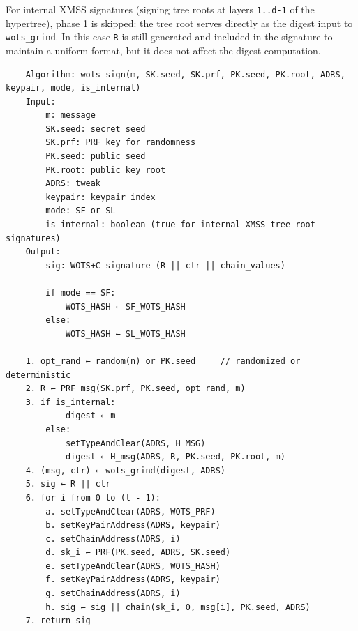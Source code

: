 For internal XMSS signatures (signing tree roots at layers \texttt{1..d-1} of the hypertree), phase 1 is skipped: the tree root serves directly as the digest input to \texttt{wots\_grind}. In this case \texttt{R} is still generated and included in the signature to maintain a uniform format, but it does not affect the digest computation.
\begin{verbatim}
    Algorithm: wots_sign(m, SK.seed, SK.prf, PK.seed, PK.root, ADRS, keypair, mode, is_internal)
    Input:
        m: message 
        SK.seed: secret seed
        SK.prf: PRF key for randomness
        PK.seed: public seed
        PK.root: public key root
        ADRS: tweak
        keypair: keypair index
        mode: SF or SL
        is_internal: boolean (true for internal XMSS tree-root signatures)
    Output:
        sig: WOTS+C signature (R || ctr || chain_values)

        if mode == SF:
            WOTS_HASH ← SF_WOTS_HASH
        else:
            WOTS_HASH ← SL_WOTS_HASH

    1. opt_rand ← random(n) or PK.seed     // randomized or deterministic
    2. R ← PRF_msg(SK.prf, PK.seed, opt_rand, m)
    3. if is_internal:
            digest ← m
        else:
            setTypeAndClear(ADRS, H_MSG)
            digest ← H_msg(ADRS, R, PK.seed, PK.root, m)
    4. (msg, ctr) ← wots_grind(digest, ADRS)
    5. sig ← R || ctr
    6. for i from 0 to (l - 1):
        a. setTypeAndClear(ADRS, WOTS_PRF)
        b. setKeyPairAddress(ADRS, keypair)
        c. setChainAddress(ADRS, i)
        d. sk_i ← PRF(PK.seed, ADRS, SK.seed)
        e. setTypeAndClear(ADRS, WOTS_HASH)
        f. setKeyPairAddress(ADRS, keypair)
        g. setChainAddress(ADRS, i)
        h. sig ← sig || chain(sk_i, 0, msg[i], PK.seed, ADRS)
    7. return sig
\end{verbatim}

